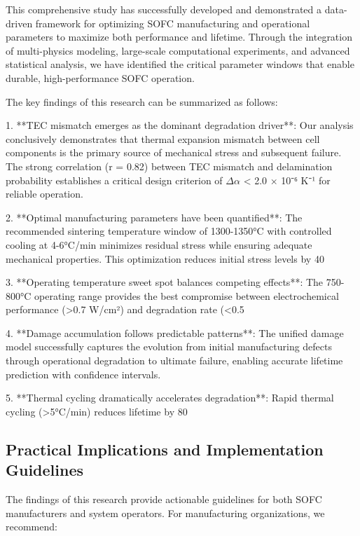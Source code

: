 \documentclass[conference]{IEEEtran}
\begin{document}
This comprehensive study has successfully developed and demonstrated a data-driven framework for optimizing SOFC manufacturing and operational parameters to maximize both performance and lifetime. Through the integration of multi-physics modeling, large-scale computational experiments, and advanced statistical analysis, we have identified the critical parameter windows that enable durable, high-performance SOFC operation.

The key findings of this research can be summarized as follows:

1. **TEC mismatch emerges as the dominant degradation driver**: Our analysis conclusively demonstrates that thermal expansion mismatch between cell components is the primary source of mechanical stress and subsequent failure. The strong correlation (r = 0.82) between TEC mismatch and delamination probability establishes a critical design criterion of $\Delta\alpha$ < 2.0 × 10⁻⁶ K⁻¹ for reliable operation.

2. **Optimal manufacturing parameters have been quantified**: The recommended sintering temperature window of 1300-1350°C with controlled cooling at 4-6°C/min minimizes residual stress while ensuring adequate mechanical properties. This optimization reduces initial stress levels by 40%

3. **Operating temperature sweet spot balances competing effects**: The 750-800°C operating range provides the best compromise between electrochemical performance (>0.7 W/cm²) and degradation rate (<0.5%

4. **Damage accumulation follows predictable patterns**: The unified damage model successfully captures the evolution from initial manufacturing defects through operational degradation to ultimate failure, enabling accurate lifetime prediction with confidence intervals.

5. **Thermal cycling dramatically accelerates degradation**: Rapid thermal cycling (>5°C/min) reduces lifetime by 80%

\subsection{Practical Implications and Implementation Guidelines}

The findings of this research provide actionable guidelines for both SOFC manufacturers and system operators. For manufacturing organizations, we recommend:
\end{document}
